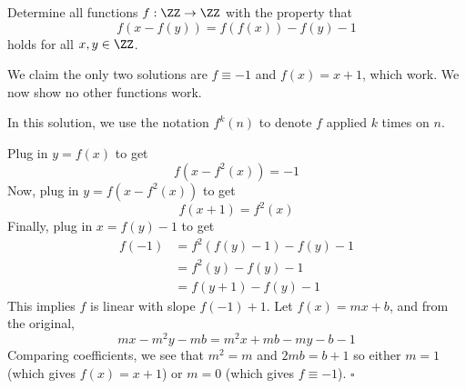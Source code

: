 
\begin{problem}[ISL 2015 A2]
    Determine all functions $f : \ZZ \to \ZZ$ with the property that \[f(x-f(y))=f(f(x))-f(y)-1\] holds for all $x,y \in \ZZ$.
\end{problem}

\begin{solution}
    We claim the only two solutions are $f \equiv -1$ and $f(x) = x+1$, which work. We now show no other functions work.
    
    In this solution, we use the notation $f^k(n)$ to denote $f$ applied $k$ times on $n$.
    
    Plug in $y = f(x)$ to get \[f(x - f^2(x)) = -1\] Now, plug in $y = f(x - f^2(x))$ to get \[f(x+1) = f^2(x)\] Finally, plug in $x = f(y)-1$ to get \begin{align*}
        f(-1) &= f^2(f(y)-1) - f(y) - 1\\
              &= f^2(y) - f(y) - 1\\
              &= f(y+1) - f(y) - 1
    \end{align*}
    This implies $f$ is linear with slope $f(-1) + 1$. Let $f(x) = mx + b$, and from the original, \[mx - m^2y - mb = m^2x + mb - my - b - 1\]
    Comparing coefficients, we see that $m^2 = m$ and $2mb = b+1$ so either $m = 1$ (which gives $f(x) = x+1$) or $m = 0$ (which gives $f \equiv -1$). $\square$
\end{solution}
